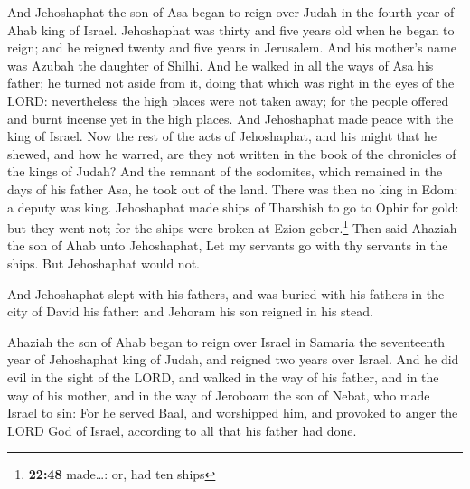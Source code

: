  And Jehoshaphat the son of Asa began to reign over Judah
in the fourth year of Ahab king of Israel.  Jehoshaphat
was thirty and five years old when he began to reign; and he reigned
twenty and five years in Jerusalem. And his mother's name was Azubah the
daughter of Shilhi.  And he walked in all the ways of Asa
his father; he turned not aside from it, doing that which was right in
the eyes of the LORD: nevertheless the high places were not taken away;
for the people offered and burnt incense yet in the high places.
 And Jehoshaphat made peace with the king of Israel.
 Now the rest of the acts of Jehoshaphat, and his might
that he shewed, and how he warred, are they not written in the book of
the chronicles of the kings of Judah?  And the remnant of
the sodomites, which remained in the days of his father Asa, he took out
of the land.  There was then no king in Edom: a deputy
was king.  Jehoshaphat made ships of Tharshish to go to
Ophir for gold: but they went not; for the ships were broken at
Ezion-geber.\footnote{\textbf{22:48} made\ldots: or, had ten ships}
 Then said Ahaziah the son of Ahab unto Jehoshaphat, Let
my servants go with thy servants in the ships. But Jehoshaphat would
not.

 And Jehoshaphat slept with his fathers, and was buried
with his fathers in the city of David his father: and Jehoram his son
reigned in his stead.

 Ahaziah the son of Ahab began to reign over Israel in
Samaria the seventeenth year of Jehoshaphat king of Judah, and reigned
two years over Israel.  And he did evil in the sight of
the LORD, and walked in the way of his father, and in the way of his
mother, and in the way of Jeroboam the son of Nebat, who made Israel to
sin:  For he served Baal, and worshipped him, and
provoked to anger the LORD God of Israel, according to all that his
father had done.
